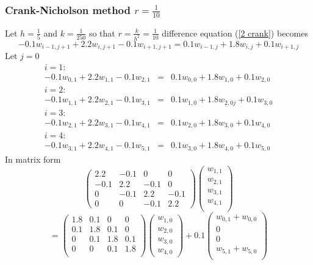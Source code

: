\begin{example}
\subsubsection{Crank-Nicholson method $r=\frac{1}{10}$}
Let $h=\frac{1}{5}$ and $k=\frac{1}{250}$ so that $r=\frac{k}{h^2}=\frac{1}{10}$
difference equation (\ref{2 crank}) becomes
\[-0.1w_{i-1,j+1}+2.2w_{i,j+1}-0.1w_{i+1,j+1}=0.1w_{i-1,j}+1.8w_{i,j}+0.1w_{i+1,j} \]
Let $j=0$
\[\begin{array}{lcl}
i=1:& &\\
-0.1w_{0,1}+2.2w_{1,1}-0.1w_{2,1}&=&0.1w_{0,0}+1.8w_{1,0}+0.1w_{2,0}\\
i=2:& &\\
-0.1w_{1,1}+2.2w_{2,1}-0.1w_{3,1}&=&0.1w_{1,0}+1.8w_{2,0j}+0.1w_{3,0}\\
i=3:& &\\
-0.1w_{2,1}+2.2w_{3,1}-0.1w_{4,1}&=&0.1w_{2,0}+1.8w_{3,0}+0.1w_{4,0}\\
i=4:& &\\
-0.1w_{3,1}+2.2w_{4,1}-0.1w_{5,1}&=&0.1w_{3,0}+1.8w_{4,0}+0.1w_{5,0}
\end{array}\]
In matrix form
\[\left(\begin{array}{cccc}
2.2&-0.1&0&0\\
-0.1&2.2&-0.1&0\\
0&-0.1&2.2&-0.1\\
0&0&-0.1&2.2
\end{array}
\right)
\left(\begin{array}{c}
w_{1,1}\\
w_{2,1}\\
w_{3,1}\\
w_{4,1}\\
\end{array}
\right)\]\[=\left(\begin{array}{cccc}
1.8&0.1&0&0\\
0.1&1.8&0.1&0\\
0&0.1&1.8&0.1\\
0&0&0.1&1.8\\

\end{array}
\right)
\left(\begin{array}{c}
w_{1,0}\\
w_{2,0}\\
w_{3,0}\\
w_{4,0}
\end{array}
\right)+0.1
\left(\begin{array}{c}
w_{0,1}+w_{0,0}\\
0\\
0\\
w_{5,1}+w_{5,0}\\
\end{array}
\right)
\]	


\end{example}
